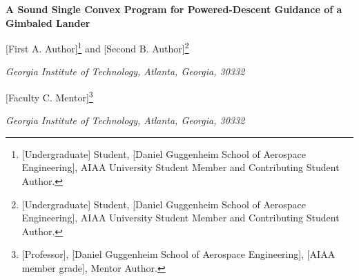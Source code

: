 
\newcommand{\Pib}{\Pi_b}
\newcommand{\Tmin}{T_{\min}}
\newcommand{\Tmax}{T_{\max}}
\newcommand{\dmax}{\delta_{\max}}
\newcommand{\thmax}{\vartheta_{\max}}


\begin{center}
{\fontsize{24}{28}\selectfont\bfseries A Sound Single Convex Program for Powered-Descent Guidance of a Gimbaled Lander\par}
\vspace{14pt}
{\large [First A. Author]\footnote{[Undergraduate] Student, [Daniel Guggenheim School of Aerospace Engineering], AIAA University Student
Member and Contributing Student Author.} and [Second B. Author]\footnote{[Undergraduate] Student, [Daniel Guggenheim School of
Aerospace Engineering], AIAA University Student Member and Contributing Student Author.}\par}
{\large\itshape Georgia Institute of Technology, Atlanta, Georgia, 30332\par}
\vspace{10pt}
{\large [Faculty C. Mentor]\footnote{[Professor], [Daniel Guggenheim School of Aerospace Engineering], [AIAA member grade], Mentor Author.}\par}
{\large\itshape Georgia Institute of Technology, Atlanta, Georgia, 30332\par}
\end{center}

